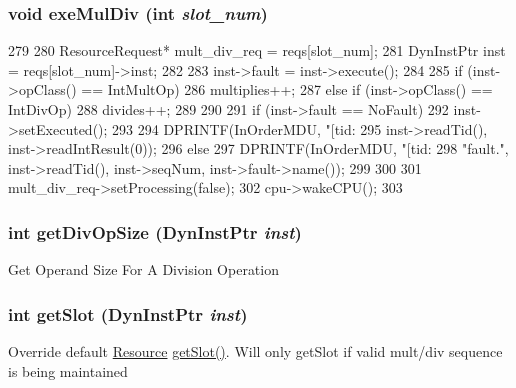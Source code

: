 \hypertarget{classMultDivUnit_a4d8dc0aa8b29a51da8e7255c1eae278f}{
\subsubsection[{exeMulDiv}]{\setlength{\rightskip}{0pt plus 5cm}void exeMulDiv (int {\em slot\_\-num})}}
\label{classMultDivUnit_a4d8dc0aa8b29a51da8e7255c1eae278f}



\begin{DoxyCode}
279 {
280     ResourceRequest* mult_div_req = reqs[slot_num];
281     DynInstPtr inst = reqs[slot_num]->inst;
282 
283     inst->fault = inst->execute();
284 
285     if (inst->opClass() == IntMultOp) {
286         multiplies++;
287     } else if (inst->opClass() == IntDivOp) {
288         divides++;
289     }
290 
291     if (inst->fault == NoFault) {
292         inst->setExecuted();
293 
294         DPRINTF(InOrderMDU, "[tid:%
295                 inst->readTid(), inst->readIntResult(0));
296     } else {
297         DPRINTF(InOrderMDU, "[tid:%
298                 "fault.\n", inst->readTid(), inst->seqNum, inst->fault->name());
299     }    
300 
301     mult_div_req->setProcessing(false);
302     cpu->wakeCPU();
303 }
\end{DoxyCode}
\hypertarget{classMultDivUnit_ab5df8d4b24a252eef4d763a43b469e2b}{
\subsubsection[{getDivOpSize}]{\setlength{\rightskip}{0pt plus 5cm}int getDivOpSize ({\bf DynInstPtr} {\em inst})}}
\label{classMultDivUnit_ab5df8d4b24a252eef4d763a43b469e2b}
Get Operand Size For A Division Operation 


\hypertarget{classMultDivUnit_ab3ba2ee95c723c8c056db0a1f2a6dfd3}{
\subsubsection[{getSlot}]{\setlength{\rightskip}{0pt plus 5cm}int getSlot ({\bf DynInstPtr} {\em inst})}}
\label{classMultDivUnit_ab3ba2ee95c723c8c056db0a1f2a6dfd3}
Override default \hyperlink{classResource}{Resource} \hyperlink{classMultDivUnit_ab3ba2ee95c723c8c056db0a1f2a6dfd3}{getSlot()}. Will only getSlot if valid mult/div sequence is being maintained 

